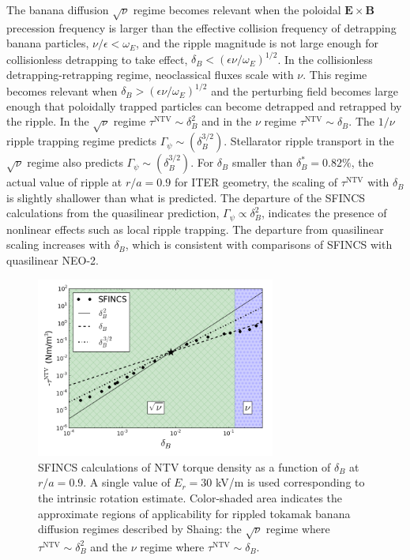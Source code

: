 \documentclass[aip, pop, preprint]{revtex4-1}
\numberwithin{figure}{section}
\numberwithin{equation}{section}
\begin{document}
The banana diffusion $\sqrt{\nu}$ regime becomes relevant when the poloidal $\bm{E} \times \bm{B}$ precession frequency is larger than the effective collision frequency of detrapping banana particles, $\nu/\epsilon < \omega_E$, and the ripple magnitude is not large enough for collisionless detrapping to take effect, $\delta_B < \left(  \epsilon \nu/\omega_E \right)^{1/2}$. In the collisionless detrapping-retrapping regime, neoclassical fluxes scale with $\nu$.\cite{Shaing2009} This regime becomes relevant when $\delta_B > \left(  \epsilon \nu/\omega_E \right)^{1/2}$ and the perturbing field becomes large enough that poloidally trapped particles can become detrapped and retrapped by the ripple. In the $\sqrt{\nu}$ regime $\tau^{\text{NTV}} \sim \delta_B^2$ and in the $\nu$ regime $\tau^{\text{NTV}} \sim \delta_B$. The $1/\nu$ ripple trapping regime predicts $\Gamma_{\psi} \sim (\delta_B^{3/2})$.\cite{Stringer1972,Connor1973} Stellarator ripple transport in the $\sqrt{\nu}$ regime also predicts $\Gamma_{\psi}\sim(\delta_B^{3/2})$.\cite{Ho1987} For $\delta_B$ smaller than $\delta_B^* = 0.82\%$, the actual value of ripple at $r/a=0.9$ for ITER geometry, the scaling of $\tau^{\text{NTV}}$ with $\delta_B$ is slightly shallower than what is predicted. The departure of the SFINCS calculations from the quasilinear prediction, $\Gamma_{\psi} \propto \delta_B^2$, indicates the presence of nonlinear effects such as local ripple trapping. The departure from quasilinear scaling increases with $\delta_B$, which is consistent with comparisons of SFINCS with quasilinear NEO-2.\cite{Martitsch2016} 

\begin{figure}[h!]
\centering
\includegraphics[width=0.7\textwidth]
{scalescan.png}
\caption{\label{fig:scalescan} SFINCS calculations of NTV torque density as a function of $\delta_B$ at $r/a = 0.9$. A single value of $E_r = 30$ kV/m is used corresponding to the intrinsic rotation estimate. Color-shaded area indicates the approximate regions of applicability for rippled tokamak banana diffusion regimes described by Shaing: the $\sqrt{\nu}$ regime where $\tau^{\text{NTV}} \sim \delta_B^2$\cite{Shaing2008} and the $\nu$ regime where $\tau^{\text{NTV}} \sim \delta_B$.\cite{Shaing2009}}
\end{figure} 
\end{document}
